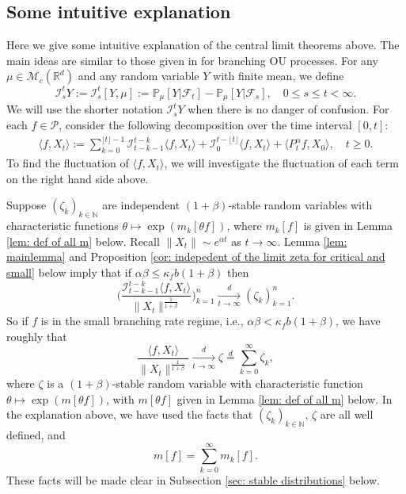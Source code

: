 \documentclass[12pt,a4paper]{amsart}
\theoremstyle{plain}
\theoremstyle{definition}
\numberwithin{equation}{section}
\begin{document}
\subsection{Some intuitive explanation}
Here we give some intuitive explanation of the central limit theorems above.
    The main ideas
    are similar to those given in \cite{MarksMilos2018CLT} for branching OU processes.
For any $\mu\in  \mathcal M_c(\mathbb R^d)$ and any random variable $Y$ with finite mean, we define
\begin{equation}\label{Ist}
    \mathcal I_s^t Y:=\mathcal I_s^t [Y, \mu]
    := \mathbb P_\mu[Y|\mathscr F_t] - \mathbb P_\mu[Y|\mathscr F_s],\quad 0 \leq s \leq t <\infty.
\end{equation}
    We will use the shorter notation $\mathcal I_s^t Y$ when there is no danger of confusion.
    For each $f\in \mathcal{P}$, consider the following decomposition over the time interval $[0,t]$:
\begin{align}
       \langle f,X_t\rangle
        :=\sum_{k=0}^{\lfloor t \rfloor-1} \mathcal I_{t-k-1}^{t-k}\langle f ,X_t\rangle+\mathcal I_0^{t-\lfloor t \rfloor}\langle f ,X_t\rangle +
         \langle P^\alpha_tf,X_0\rangle,
               \quad t\geq 0.
\end{align}
   To find the fluctuation of $\langle f,X_t\rangle$, we will investigate the fluctuation of
   each term on the right hand side above.

    Suppose $(\zeta_k)_{k \in \mathbb N}$ are independent $(1+\beta)$-stable random variables with characteristic functions
$\theta\mapsto \exp( m_k[\theta f])$,
    where $m_k[f]$ is given in Lemma \ref{lem: def of all m} below.
    Recall $\|X_t\|\sim e^{\alpha t}$ as $t\to\infty$.
    Lemma \ref{lem: mainlemma} and 
   Proposition \ref{cor: indepedent of the limit zeta for critical and small} below  
    imply that if $\alpha\beta \leq \kappa_f b(1+\beta) $ then
\[
    \bigg(\frac{\mathcal I^{t-k}_{t-k-1}\langle f,X_t\rangle}{\|X_t\|^{\frac{1}{1+\beta}}}\bigg)_{k=1}^n
    \xrightarrow [t\to \infty]{d} (\zeta_k)_{k=1}^n.
\]
    So if $f$ is in the small branching rate regime, i.e., $\alpha \beta < \kappa_f b(1+\beta)$, we have roughly that
\[
     \frac{\langle f,X_t\rangle}{\|X_t\|^{\frac{1}{1+\beta}}} \xrightarrow[t\to \infty]{d} \zeta\overset{d}{=}\sum_{k=0}^\infty \zeta_k,
\]
	where $\zeta$ is a $(1+\beta)$-stable random variable with characteristic function
$\theta\mapsto \exp(m[\theta f])$,
    with $m[\theta f]$ given in Lemma \ref{lem: def of all m} below.
	In the explanation above, we have used the facts that 
    $(\zeta_k)_{k\in \mathbb N}$, $\zeta$ are all well defined, and
\begin{equation}
\label{eq: equatlity for mf for small rate}
    m[f] =  \sum_{k=0}^\infty m_k[ f].
\end{equation}
    These facts will be made clear in Subsection \ref{sec: stable distributions} below.
\end{document}
